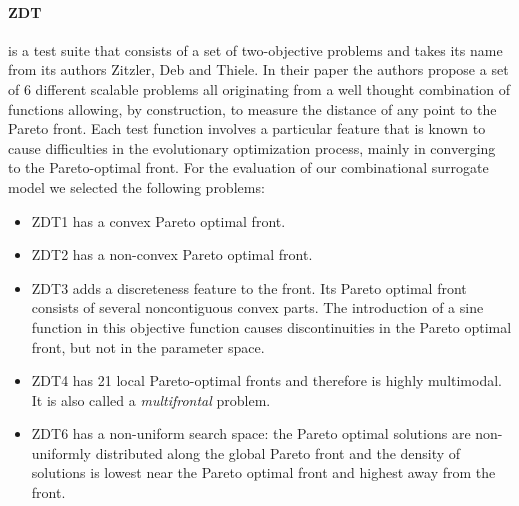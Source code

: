         \paragraph{ZDT}\cite{ZitzlerDT00} is a test suite that consists of a set of two-objective problems and takes its name from its authors Zitzler, Deb and Thiele. In their paper the authors propose a set of 6 different scalable problems all originating from a well thought combination of functions allowing, by construction, to measure the distance of any point to the Pareto front. Each test function involves a particular feature that is known to cause difficulties in the evolutionary optimization process, mainly in converging to the Pareto-optimal front.
        For the evaluation of our combinational surrogate model we selected the following problems:
        \begin{itemize}
            \item ZDT1 has a convex Pareto optimal front.
            \item ZDT2 has a non-convex Pareto optimal front.
            \item ZDT3 adds a discreteness feature to the front. Its Pareto optimal front consists of several noncontiguous convex parts. The introduction of a sine function in this objective function causes discontinuities in the Pareto optimal front, but not in the parameter space.
            \item ZDT4 has 21 local Pareto-optimal fronts and therefore is highly multimodal. It is also called a \textit{multifrontal} problem.
            \item ZDT6 has a non-uniform search space: the Pareto optimal solutions are non-uniformly distributed along the global Pareto front and the density of solutions is lowest near the Pareto optimal front and highest away from the front.
        \end{itemize}


